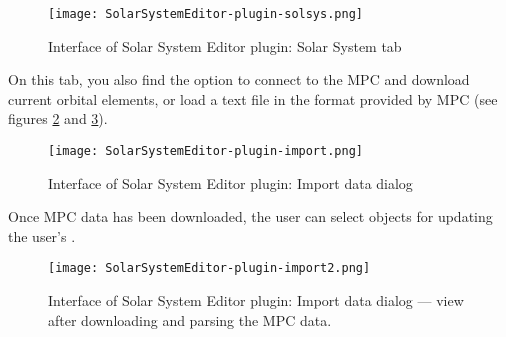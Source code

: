 \begin{figure}[tbh]\centering
	\texttt{[image: SolarSystemEditor-plugin-solsys.png]}
	\caption{Interface of Solar System Editor plugin: Solar System tab}
	\label{fig:SolarSystemEditor:SolarSystem}
\end{figure}

On this tab, you also find the option to connect to the MPC and download current orbital elements, 
or load a text file in the format provided by MPC (see figures \ref{fig:SolarSystemEditor:ImportData:InitialView} and \ref{fig:SolarSystemEditor:ImportData:FinalView}). 

\begin{figure}[tbph]\centering
\texttt{[image: SolarSystemEditor-plugin-import.png]}
\caption{Interface of Solar System Editor plugin: Import data dialog}
\label{fig:SolarSystemEditor:ImportData:InitialView}
\end{figure}

Once MPC data has been downloaded, the user can select objects for updating the user's .

\begin{figure}[tbph]\centering
\texttt{[image: SolarSystemEditor-plugin-import2.png]}
\caption{Interface of Solar System Editor plugin: Import data dialog --- view after downloading and parsing the MPC data.}
\label{fig:SolarSystemEditor:ImportData:FinalView}
\end{figure}



